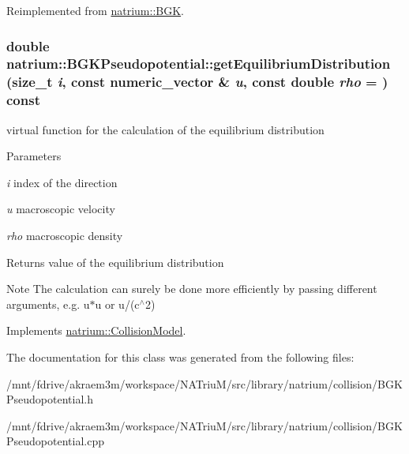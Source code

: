 Reimplemented from \hyperlink{classnatrium_1_1BGK_a9fa1c980217a183fc4762954e86ba36d}{natrium::BGK}.\hypertarget{classnatrium_1_1BGKPseudopotential_a63ce98e44a07466963fb123cac9dd905}{
\subsubsection[{getEquilibriumDistribution}]{\setlength{\rightskip}{0pt plus 5cm}double natrium::BGKPseudopotential::getEquilibriumDistribution (size\_\-t {\em i}, \/  const numeric\_\-vector \& {\em u}, \/  const double {\em rho} = {}) const}}
\label{classnatrium_1_1BGKPseudopotential_a63ce98e44a07466963fb123cac9dd905}


virtual function for the calculation of the equilibrium distribution 
\begin{DoxyParams}{Parameters}
\item[{\em i}]index of the direction \item[{\em u}]macroscopic velocity \item[{\em rho}]macroscopic density \end{DoxyParams}
\begin{DoxyReturn}{Returns}
value of the equilibrium distribution 
\end{DoxyReturn}
\begin{DoxyNote}{Note}
The calculation can surely be done more efficiently by passing different arguments, e.g. u$\ast$u or u/(c$^\wedge$2) 
\end{DoxyNote}


Implements \hyperlink{classnatrium_1_1CollisionModel_a88b382d63da80e950bc58e8afad769a6}{natrium::CollisionModel}.

The documentation for this class was generated from the following files:\begin{DoxyCompactItemize}
\item 
/mnt/fdrive/akraem3m/workspace/NATriuM/src/library/natrium/collision/BGKPseudopotential.h\item 
/mnt/fdrive/akraem3m/workspace/NATriuM/src/library/natrium/collision/BGKPseudopotential.cpp\end{DoxyCompactItemize}

